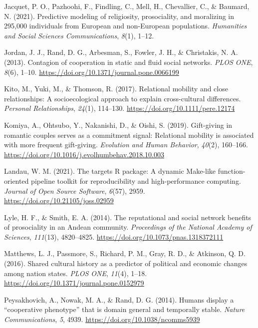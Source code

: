 \documentclass[
  man,floatsintext]{apa6}
\newlength{\cslhangindent}
\newlength{\cslentryspacingunit} %
\newenvironment{CSLReferences}[2] %
 {%
  \setlength{\parindent}{0pt}
  \ifodd #1
  \let\oldpar\par
  \def\par{\hangindent=\cslhangindent\oldpar}
  \fi
  \setlength{\parskip}{#2\cslentryspacingunit}
 }%
 {}
\begin{document}
\begin{CSLReferences}{1}{0}
\leavevmode{}%
Jacquet, P. O., Pazhoohi, F., Findling, C., Mell, H., Chevallier, C., \& Baumard, N. (2021). Predictive modeling of religiosity, prosociality, and moralizing in 295,000 individuals from {European} and {non-European} populations. \emph{Humanities and Social Sciences Communications}, \emph{8}(1), 1--12.

\leavevmode{}%
Jordan, J. J., Rand, D. G., Arbesman, S., Fowler, J. H., \& Christakis, N. A. (2013). Contagion of cooperation in static and fluid social networks. \emph{PLOS ONE}, \emph{8}(6), 1--10. \url{https://doi.org/10.1371/journal.pone.0066199}

\leavevmode{}%
Kito, M., Yuki, M., \& Thomson, R. (2017). Relational mobility and close relationships: A socioecological approach to explain cross-cultural differences. \emph{Personal Relationships}, \emph{24}(1), 114--130. \url{https://doi.org/10.1111/pere.12174}

\leavevmode{}%
Komiya, A., Ohtsubo, Y., Nakanishi, D., \& Oishi, S. (2019). Gift-giving in romantic couples serves as a commitment signal: Relational mobility is associated with more frequent gift-giving. \emph{Evolution and Human Behavior}, \emph{40}(2), 160--166. \url{https://doi.org/10.1016/j.evolhumbehav.2018.10.003}

\leavevmode{}%
Landau, W. M. (2021). The targets {R} package: A dynamic {Make}-like function-oriented pipeline toolkit for reproducibility and high-performance computing. \emph{Journal of Open Source Software}, \emph{6}(57), 2959. \url{https://doi.org/10.21105/joss.02959}

\leavevmode{}%
Lyle, H. F., \& Smith, E. A. (2014). The reputational and social network benefits of prosociality in an {A}ndean community. \emph{Proceedings of the National Academy of Sciences}, \emph{111}(13), 4820--4825. \url{https://doi.org/10.1073/pnas.1318372111}

\leavevmode{}%
Matthews, L. J., Passmore, S., Richard, P. M., Gray, R. D., \& Atkinson, Q. D. (2016). Shared cultural history as a predictor of political and economic changes among nation states. \emph{PLOS ONE}, \emph{11}(4), 1--18. \url{https://doi.org/10.1371/journal.pone.0152979}

\leavevmode{}%
Peysakhovich, A., Nowak, M. A., \& Rand, D. G. (2014). Humans display a {``cooperative phenotype''} that is domain general and temporally stable. \emph{Nature Communications}, \emph{5}, 4939. \url{https://doi.org/10.1038/ncomms5939}


\end{CSLReferences}
\end{document}
